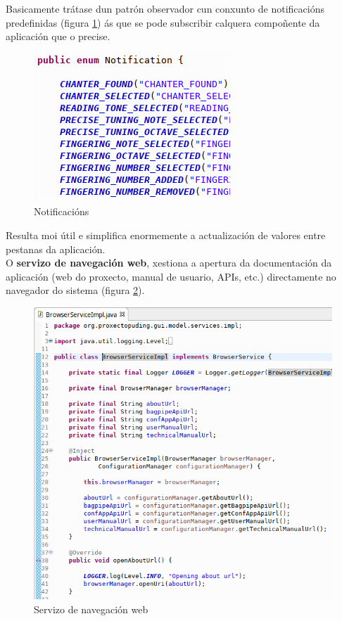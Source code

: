    Basicamente trátase dun patrón observador cun conxunto de notificacións
   predefinidas (figura \ref{figura:Notificacions}) ás que se pode subscribir
   calquera compoñente da aplicación que o precise. \\
   
   \begin{figure}[htbp]
    \centering
    \includegraphics[scale=0.6, keepaspectratio=true]{./imagenes/notificacions.png}
    \caption{Notificacións}
    \label{figura:Notificacions}
   \end{figure}
   
   Resulta moi útil e simplifica enormemente a actualización de valores entre
   pestanas da aplicación. \\
   
   O \textbf{servizo de navegación web}, xestiona a apertura da documentación da
   aplicación (web do proxecto, manual de usuario, APIs, etc.) directamente no
   navegador do sistema (figura \ref{figura:Navegador}). \\
   
   \begin{figure}[htbp]
    \centering
    \includegraphics[scale=0.6, keepaspectratio=true]{./imagenes/navegador.png}
    \caption{Servizo de navegación web}
    \label{figura:Navegador}
   \end{figure}
   
